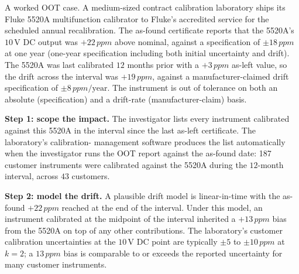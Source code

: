A worked OOT case. A medium-sized contract calibration laboratory
ships its Fluke 5520A multifunction calibrator
\cite{web:ch03t3-fluke-5520a} to Fluke's accredited service for
the scheduled annual recalibration. The as-found certificate
reports that the 5520A's $10\,\si{\volt}$ DC output was
$+22\,\si{ppm}$ above nominal, against a specification of
$\pm 18\,\si{ppm}$ at one year (one-year specification including
both initial uncertainty and drift). The 5520A was last
calibrated $12$ months prior with a $+3\,\si{ppm}$ as-left value,
so the drift across the interval was $+19\,\si{ppm}$, against a
manufacturer-claimed drift specification of $\pm 8\,\si{ppm}/
\text{year}$. The instrument is out of tolerance on both an
absolute (specification) and a drift-rate (manufacturer-claim)
basis.

\textbf{Step 1: scope the impact.} The investigator lists every
instrument calibrated against this 5520A in the interval since
the last as-left certificate. The laboratory's calibration-
management software produces the list automatically when the
investigator runs the OOT report against the as-found date: 187
customer instruments were calibrated against the 5520A during
the $12$-month interval, across $43$ customers.

\textbf{Step 2: model the drift.} A plausible drift model is
linear-in-time with the as-found $+22\,\si{ppm}$ reached at the
end of the interval. Under this model, an instrument calibrated
at the midpoint of the interval inherited a $+13\,\si{ppm}$
bias from the 5520A on top of any other contributions. The
laboratory's customer calibration uncertainties at the
$10\,\si{\volt}$ DC point are typically $\pm 5$ to
$\pm 10\,\si{ppm}$ at $k = 2$; a $13\,\si{ppm}$ bias is comparable
to or exceeds the reported uncertainty for many customer
instruments.

